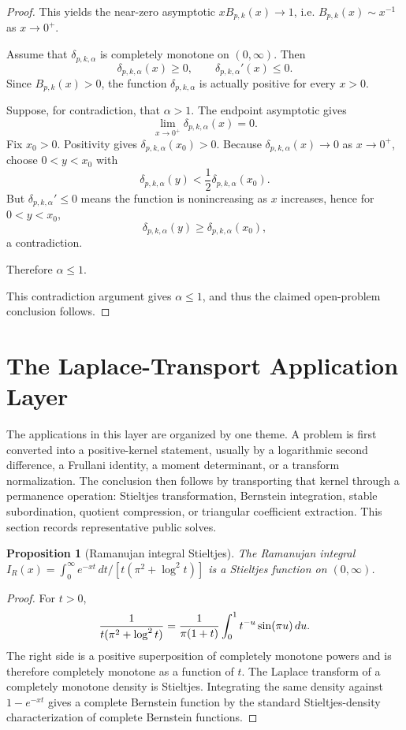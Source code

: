 \documentclass[11pt]{article}
\numberwithin{equation}{section}
\newtheorem{proposition}[theorem]{Proposition}
\theoremstyle{definition}
\theoremstyle{remark}
\newcommand{\1}{\mathbf 1}
\begin{document}
\begin{proof}
This yields the near-zero asymptotic \(xB_{p,k}(x)\to1\), i.e. \(B_{p,k}(x)\sim x^{-1}\) as \(x\to0^+\).

Assume that \(\delta_{p,k,\alpha}\) is completely monotone on \((0,\infty)\). Then
\[
\delta_{p,k,\alpha}(x)\ge0,\qquad
\delta_{p,k,\alpha}'(x)\le0.
\]
Since \(B_{p,k}(x)>0\), the function \(\delta_{p,k,\alpha}\) is actually positive for every \(x>0\).

Suppose, for contradiction, that \(\alpha>1\). The endpoint asymptotic gives
\[
\lim_{x\to0^+}\delta_{p,k,\alpha}(x)=0.
\]
Fix \(x_0>0\). Positivity gives \(\delta_{p,k,\alpha}(x_0)>0\). Because \(\delta_{p,k,\alpha}(x)\to0\) as \(x\to0^+\), choose \(0<y<x_0\) with
\[
\delta_{p,k,\alpha}(y)<\frac12\delta_{p,k,\alpha}(x_0).
\]
But \(\delta_{p,k,\alpha}'\le0\) means the function is nonincreasing as \(x\) increases, hence for \(0<y<x_0\),
\[
\delta_{p,k,\alpha}(y)\ge\delta_{p,k,\alpha}(x_0),
\]
a contradiction.

Therefore \(\alpha\le1\).

This contradiction argument gives \(\alpha\le1\), and thus the claimed open-problem conclusion follows.
\end{proof}


\section{The Laplace-Transport Application Layer}
\label{sec:transport-layer}



The applications in this layer are organized by one theme.  A problem is first converted
into a positive-kernel statement, usually by a logarithmic second difference, a
Frullani identity, a moment determinant, or a transform normalization.  The
conclusion then follows by transporting that kernel through a permanence
operation: Stieltjes transformation, Bernstein integration, stable
subordination, quotient compression, or triangular coefficient extraction.  This
section records representative public solves.

\begin{proposition}[Ramanujan integral Stieltjes]
\label{res:ramanujan-integral-stieltjes}
The Ramanujan integral \(I_R(x)=\int_0^\infty e^{-xt}\,dt/[t(\pi^2+\log^2 t)]\) is a Stieltjes function on \((0,\infty)\).
\end{proposition}

\begin{proof}
For \(t>0\),
\[
 {1\over t(\pi^2+\log^2t)}
   ={1\over \pi(1+t)}\int_0^1 t^{-u}\sin(\pi u)\,du .
\]
The right side is a positive superposition of completely monotone powers and is
therefore completely monotone as a function of \(t\).  The Laplace transform of
a completely monotone density is Stieltjes.  Integrating the same density
against \(1-e^{-xt}\) gives a complete Bernstein function by the standard
Stieltjes-density characterization of complete Bernstein functions.
\end{proof}
\end{document}
